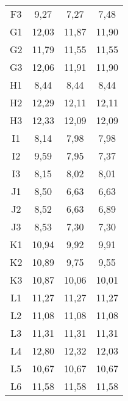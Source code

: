 \begin{center}
\begin{longtable}{cccc}
    F3    & 9,27  & 7,27  & 7,48 \\
    G1    & 12,03 & 11,87 & 11,90 \\
    G2    & 11,79 & 11,55 & 11,55 \\
    G3    & 12,06 & 11,91 & 11,90 \\
    H1    & 8,44  & 8,44  & 8,44 \\
    H2    & 12,29 & 12,11 & 12,11 \\
    H3    & 12,33 & 12,09 & 12,09 \\
    I1    & 8,14  & 7,98  & 7,98 \\
    I2    & 9,59  & 7,95  & 7,37 \\
    I3    & 8,15  & 8,02  & 8,01 \\
    J1    & 8,50  & 6,63  & 6,63 \\
    J2    & 8,52  & 6,63  & 6,89 \\
    J3    & 8,53  & 7,30  & 7,30 \\
    K1    & 10,94 & 9,92  & 9,91 \\
    K2    & 10,89 & 9,75  & 9,55 \\
    K3    & 10,87 & 10,06 & 10,01 \\
    L1    & 11,27 & 11,27 & 11,27 \\
    L2    & 11,08 & 11,08 & 11,08 \\
    L3    & 11,31 & 11,31 & 11,31 \\
    L4    & 12,80 & 12,32 & 12,03 \\
    L5    & 10,67 & 10,67 & 10,67 \\
    L6    & 11,58 & 11,58 & 11,58 \\

\end{longtable}
\end{center}

